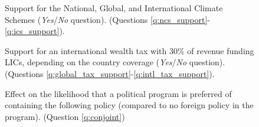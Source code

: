 \documentclass[12pt,english]{article}
\begin{document}
\begin{bibunit}
\begin{figure}
\begin{subfigure}{.4\textwidth}
  \end{subfigure}
\end{figure}
\begin{figure}[h!]
    \caption[Support for the NCS, GCS, ICS]{Support for the National, Global, and International Climate Schemes (\textit{Yes}/\textit{No} question). \hfill (Questions \ref{q:ncs_support}-\ref{q:ics_support}).
    }\label{fig:ics}
\end{figure}
\begin{figure}[h!]
    \caption[Support for an international wealth depending on country coverage]{Support for an international wealth tax with 30\% of revenue funding LICs, depending on the country coverage (\textit{Yes}/\textit{No} question). \hfill (Questions \ref{q:global_tax_support}-\ref{q:intl_tax_support}).
    }\label{fig:wealth_tax}
\end{figure}
    \begin{figure}
\caption[Conjoint analysis: effect of development aid and millionaire tax]{Effect on the likelihood that a political program is preferred of containing the following policy (compared to no foreign policy in the program). \hfill (Question \ref{q:conjoint})} \label{fig:conjoint}

\end{figure}
\end{bibunit}
\end{document}
